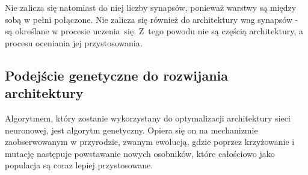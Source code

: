 \noindent
Nie zalicza się natomiast do niej liczby synapsów,
ponieważ warstwy są między sobą w pełni połą\-czone.
Nie zalicza się również do architektury wag synapsów
- są określane w procesie ucze\-nia~się.
Z~tego powodu nie są częścią architektury,
a procesu oceniania jej przystosowania.

\subsection{Podejście genetyczne do rozwijania architektury}
Algorytmem, który zostanie wykorzystany do optymalizacji
architektury sieci neuronowej, jest algorytm genetyczny.
Opiera się on na mechanizmie zaobserwowanym w przyrodzie,
zwanym ewolucją, gdzie poprzez krzyżowanie i mutację
następuje powstawanie nowych osobników,
które całościowo jako populacja są coraz lepiej przystosowane.

